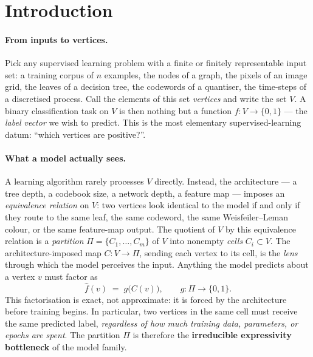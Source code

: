 \documentclass[10pt]{article}
\theoremstyle{definition}
\theoremstyle{remark}
\begin{document}
\section{Introduction}\label{sec:intro}

\paragraph{From inputs to vertices.}
Pick any supervised learning problem with a finite or finitely
representable input set: a training corpus of $n$ examples, the
nodes of a graph, the pixels of an image grid, the leaves of a
decision tree, the codewords of a quantiser, the time-steps of a
discretised process. Call the elements of this set
\emph{vertices} and write the set $V$. A binary classification
task on $V$ is then nothing but a function
$f : V \to \{0, 1\}$ --- the \emph{label vector} we wish to
predict. This is the most elementary supervised-learning datum:
``which vertices are positive?''.

\paragraph{What a model actually sees.} A learning algorithm
rarely processes $V$ directly. Instead, the architecture --- a
tree depth, a codebook size, a network depth, a feature map ---
imposes an \emph{equivalence relation} on $V$: two vertices look
identical to the model if and only if they route to the same leaf,
the same codeword, the same Weisfeiler--Leman colour, or the same
feature-map output. The quotient of $V$ by this equivalence
relation is a \emph{partition}
$\Pi = \{C_{1}, \ldots, C_{m}\}$ of $V$ into nonempty
\emph{cells} $C_{i} \subset V$. The architecture-imposed map
$C : V \to \Pi$, sending each vertex to its cell, is the
\emph{lens} through which the model perceives the input. Anything
the model predicts about a vertex $v$ must factor as
\[
  \widehat{f}(v) \;=\; g\bigl(C(v)\bigr),
  \qquad g : \Pi \to \{0, 1\}.
\]
This factorisation is exact, not approximate: it is forced by the
architecture before training begins. In particular, two vertices
in the same cell must receive the same predicted label,
\emph{regardless of how much training data, parameters, or epochs
are spent}. The partition $\Pi$ is therefore the
\textbf{irreducible expressivity bottleneck} of the model
family.
\end{document}
